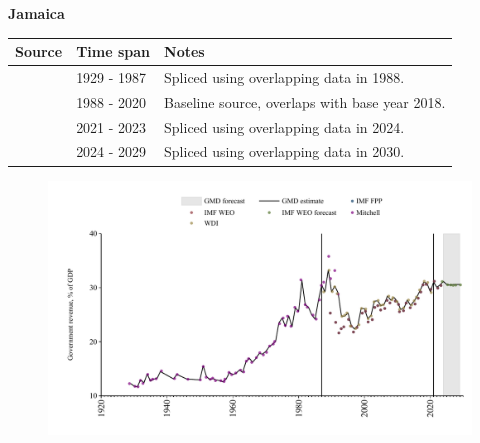 \documentclass[12pt,a4paper,landscape]{article}
\begin{document}
\begin{adjustbox}{max totalsize={\paperwidth}{\paperheight},center}
\begin{minipage}[t][\textheight][t]{\textwidth}
\vspace*{0.5cm}
{}
\begin{center}
{\Large\bfseries Jamaica}
\end{center}
\vspace{0.5cm}
\begin{table}[H]
\centering
\small
\begin{tabular}{|l|l|l|}
\hline
\textbf{Source} & \textbf{Time span} & \textbf{Notes} \\
\hline
\rowcolor{white}\cite{Mitchell}& 1929 - 1987 &Spliced using overlapping data in 1988.\\
\rowcolor{lightgray}\cite{WDI}& 1988 - 2020 &Baseline source, overlaps with base year 2018.\\
\rowcolor{white}\cite{IMF_WEO}& 2021 - 2023 &Spliced using overlapping data in 2024.\\
\rowcolor{lightgray}\cite{IMF_WEO_forecast}& 2024 - 2029 &Spliced using overlapping data in 2030.\\
\hline
\end{tabular}
\end{table}
\begin{figure}[H]
\centering
\includegraphics[width=\textwidth,height=0.6\textheight,keepaspectratio]{graphs/JAM_govrev_GDP.pdf}
\end{figure}
\end{minipage}
\end{adjustbox}
\end{document}
